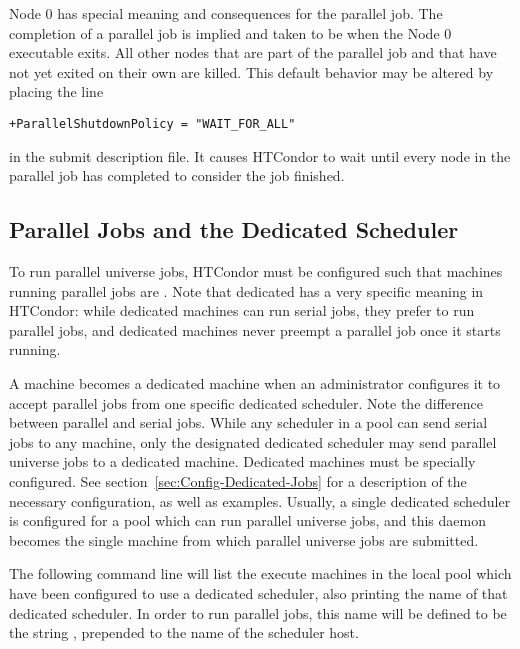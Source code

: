 Node 0 has special meaning and consequences for the parallel job.
The completion of a parallel job is implied and taken to be
when the Node 0 executable exits.  All other nodes that are
part of the parallel job and that have not yet exited on their 
own are killed.
This default behavior may be altered by placing the line
\begin{verbatim}
+ParallelShutdownPolicy = "WAIT_FOR_ALL"
\end{verbatim}
in the submit description file.
It causes HTCondor to wait until every node in the parallel 
job has completed to consider the job finished. 

\subsection{\label{sec:parallel-setup}Parallel Jobs and the Dedicated Scheduler}

To run parallel universe jobs, HTCondor must be configured such that 
machines running parallel jobs are .  
Note that dedicated has a very specific meaning in HTCondor:
while dedicated machines can run serial jobs, they prefer to run
parallel jobs, and dedicated machines never preempt a parallel job 
once it starts running.

A machine becomes a dedicated machine when an administrator configures
it to accept parallel jobs from one specific dedicated scheduler.  
Note the difference between parallel and serial jobs.
While any scheduler in a pool can send serial jobs to any machine,
only the designated dedicated scheduler may send parallel universe
jobs to a dedicated machine.
Dedicated machines must be specially configured.  
See section~\ref{sec:Config-Dedicated-Jobs} for a description
of the necessary configuration, as well as examples.
Usually, a single dedicated scheduler is configured for a pool
which can run parallel universe jobs, and this  daemon
becomes the single machine from which parallel universe
jobs are submitted.

The following command line will list the execute machines 
in the local pool which have been configured to use a dedicated
scheduler, also printing the name of that dedicated scheduler.
In order to run parallel jobs, this name will be defined to be
the string , prepended to the name of the
scheduler host.

